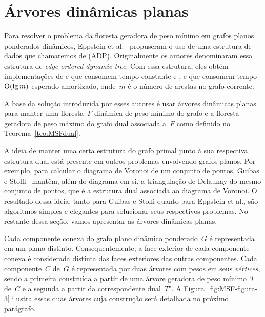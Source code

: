\newpage
\section{Árvores dinâmicas planas}
\label{sec:ADP}

Para resolver o problema da floresta geradora de peso mínimo em grafos planos ponderados dinâmicos, Eppstein et al.~\cite{EPPSTEIN-planar} propuseram o uso de uma estrutura de dados que chamaremos de  (ADP). Originalmente os autores denominaram essa estrutura de \textit{edge ordered dynamic tree}.
Com essa estrutura, eles obtém implementações de \MSFCreate{} e \MSFweight{} que consomem tempo constante e \MSFaddEdge{}, \MSFdelEdge{} e \MSFupdate{} que consomem tempo~$\mathrm{O}(\lg m)$ esperado amortizado, onde~$m$ é o número de arestas no grafo corrente. 

A base da solução introduzida por esses autores é usar árvores dinâmicas planas para manter uma floresta~$F$ dinâmica de peso mínimo do grafo e a floresta geradora de peso máximo do grafo dual associada a~$F$ como definido no Teorema~\ref{teo:MSFdual}.

A ideia de manter uma certa estrutura do grafo primal junto à sua respectiva estrutura dual está presente em outros problemas envolvendo grafos planos.
Por exemplo, para calcular o diagrama de Voronoi de um conjunto de pontos, Guibas e Stolfi~\cite{stolfi} mantêm, além do diagrama em si, a triangulação de Delaunay do mesmo conjunto de pontos, que é a estrutura dual associada ao diagrama de Voronoi.
O resultado dessa ideia, tanto para Guibas e Stolfi quanto para Eppstein et al., são algoritmos simples e elegantes para solucionar seus respectivos problemas.
No restante dessa seção, vamos apresentar as árvores dinâmicas planas.

Cada componente conexa do grafo plano dinâmico ponderado~$G$ é representada em um plano distinto.
Consequentemente, a face exterior de cada componente conexa é considerada distinta das faces exteriores das outras componentes.
Cada componente~$C$ de~$G$ é representada por duas árvores com pesos em seus \textit{vértices}, sendo a primeira construída a partir de uma árvore geradora de peso mínimo~$T$ de~$C$ e a segunda a partir da correspondente dual~$T^\star$.
A Figura~\ref{fig:MSF-figura-3} ilustra essas duas árvores cuja construção será detalhada no próximo parágrafo.

